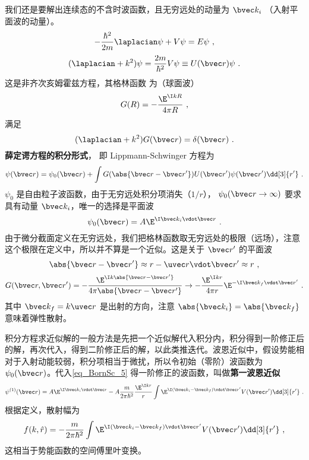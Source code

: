 

我们还是要解出连续态的不含时波函数，且无穷远处的动量为 $\bvec k_i$ （入射平面波的动量）。
\begin{equation}
-\frac{\hbar^2}{2m} \laplacian\psi  + V\psi  = E\psi~,
\end{equation}
\begin{equation}
(\laplacian + k^2)\psi  = \frac{2m}{\hbar^2} V\psi  \equiv U(\bvec r)\psi~.
\end{equation}
这是非齐次亥姆霍兹方程，其格林函数%
为（球面波）
\begin{equation}
G(R) =  -\frac{\E^{\I kR}}{4\pi R}~,
\end{equation}
满足
\begin{equation}
(\laplacian + k^2)G(\bvec r) = \delta(\bvec r)~.
\end{equation}
\textbf{薛定谔方程的积分形式}， 即 Lippmann-Schwinger 方程为
\begin{equation}\label{eq_BornSc_5}
\psi(\bvec r) = \psi_0(\bvec r) + \int G(\abs{\bvec r - \bvec r'})U(\bvec r')\psi (\bvec r') \dd[3]{r'}~.
\end{equation}
$\psi_0$ 是自由粒子波函数，由于无穷远处积分项消失（$1/r$）， $\psi_0(\bvec r\to\infty)$ 要求具有动量 $\bvec k_i$，唯一的选择是平面波
\begin{equation}
\psi_0(\bvec r) = A\E^{\I\bvec k_i \vdot \bvec r}~.
\end{equation}
由于微分截面定义在无穷远处，我们把格林函数取无穷远处的极限（远场），注意这个极限在定义中，所以并不算是一个近似。这是关于 $\bvec r'$ 的平面波
\begin{equation}
\abs{\bvec r - \bvec r'} \approx r - \uvec r \vdot \bvec r' \approx r~,
\end{equation}
\begin{equation}
G(\bvec r, \bvec r') =  - \frac{\E^{\I k \abs{\bvec r - \bvec r'}}}{4\pi\abs{\bvec r - \bvec r'}} \to  - \frac{\E^{\I kr}}{4\pi r} \E^{-\I \bvec k_f \vdot \bvec r'}~.
\end{equation}
其中 $\bvec k_f = k\uvec r$ 是出射的方向，注意 $\abs{\bvec k_i} = \abs{\bvec k_f}$ 意味着弹性散射。

积分方程求近似解的一般方法是先把一个近似解代入积分内，积分得到一阶修正后的解，再次代入，得到二阶修正后的解，以此类推迭代。波恩近似中，假设势能相对于入射动能较弱，积分项相当于微扰，所以令初始（零阶）波函数为 $\psi_0(\bvec r)$。代入\autoref{eq_BornSc_5} 得一阶修正的波函数，叫做\textbf{第一波恩近似}
\begin{equation}
\psi ^{(1)}(\bvec r) = A\E^{\I\bvec k_i \vdot \bvec r} - A \frac{m}{2\pi\hbar^2} \frac{\E^{\I kr}}{r}\int \E^{\I (\bvec k_i - \bvec k_f) \vdot \bvec r'} V(\bvec r') \dd[3]{r'}~.
\end{equation}
根据定义，散射幅为
\begin{equation}
f(k, \hat r) =  - \frac{m}{2\pi\hbar^2} \int \E^{\I (\bvec k_i - \bvec k_f) \vdot \bvec r'} V(\bvec r') \dd[3]{r'}~,
\end{equation}
这相当于势能函数的空间傅里叶变换。

